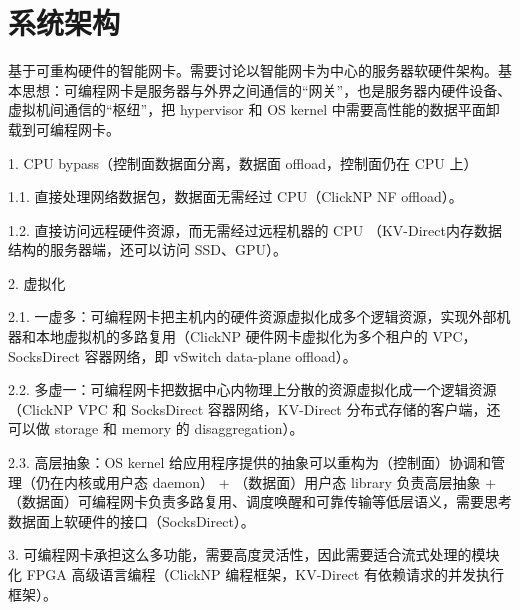 \chapter{系统架构}

基于可重构硬件的智能网卡。需要讨论以智能网卡为中心的服务器软硬件架构。基本思想：可编程网卡是服务器与外界之间通信的“网关”，也是服务器内硬件设备、虚拟机间通信的“枢纽”，把 hypervisor 和 OS kernel 中需要高性能的数据平面卸载到可编程网卡。

1. CPU bypass（控制面数据面分离，数据面 offload，控制面仍在 CPU 上）

1.1. 直接处理网络数据包，数据面无需经过 CPU（ClickNP NF offload）。

1.2. 直接访问远程硬件资源，而无需经过远程机器的 CPU （KV-Direct内存数据结构的服务器端，还可以访问 SSD、GPU）。

2. 虚拟化

2.1. 一虚多：可编程网卡把主机内的硬件资源虚拟化成多个逻辑资源，实现外部机器和本地虚拟机的多路复用（ClickNP 硬件网卡虚拟化为多个租户的 VPC，SocksDirect 容器网络，即 vSwitch data-plane offload）。

2.2. 多虚一：可编程网卡把数据中心内物理上分散的资源虚拟化成一个逻辑资源（ClickNP VPC 和 SocksDirect 容器网络，KV-Direct 分布式存储的客户端，还可以做 storage 和 memory 的 disaggregation）。

2.3. 高层抽象：OS kernel 给应用程序提供的抽象可以重构为（控制面）协调和管理（仍在内核或用户态 daemon） + （数据面）用户态 library 负责高层抽象 + （数据面）可编程网卡负责多路复用、调度唤醒和可靠传输等低层语义，需要思考数据面上软硬件的接口（SocksDirect）。

3. 可编程网卡承担这么多功能，需要高度灵活性，因此需要适合流式处理的模块化 FPGA 高级语言编程（ClickNP 编程框架，KV-Direct 有依赖请求的并发执行框架）。